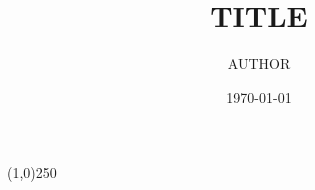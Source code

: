 \documentclass[12pt]{article}
\title{TITLE}
\author{AUTHOR}
\date{\today \hspace{6pt} \currenttime}
\begin{document}
\maketitle

\begin{center}
\line(1,0){250}
\end{center}

\tableofcontents
\newpage
\end{document}
